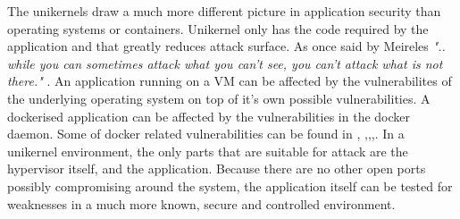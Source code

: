 The unikernels draw a much more different picture in application security than operating systems or containers. Unikernel only has the code required by the application and that greatly reduces attack surface. As once said by Meireles  \textit{".. while you can sometimes attack what you can't see, you can't attack what is not there."} \cite{mailing-list}. An application running on a VM can be affected by the vulnerabilites of the underlying operating system on top of it's own possible vulnerabilities. A dockerised application can be affected by the vulnerabilities in the docker daemon. Some of docker related vulnerabilities can be found in \cite{CVE-2019-14271-details}, \cite{CVE-2018-9862-details},\cite{CVE-2018-8115-details},\cite{CVE-2018-11757-details},\cite{CVE-2019-5736-details}. In a unikernel environment, the only parts that are suitable for attack are the hypervisor itself, and the application. Because there are no other open ports possibly compromising around the system, the application itself can be tested for weaknesses in a much more known, secure and controlled environment.


